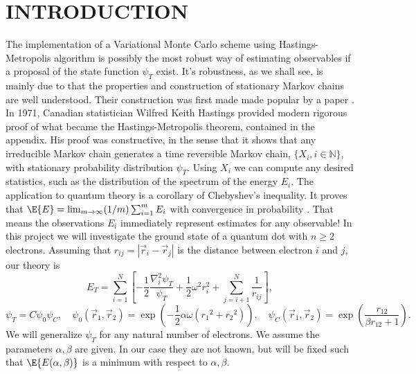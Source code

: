 \documentclass[11pt,english,a4paper]{article}
\begin{document}
\section*{\uppercase{Introduction}}
The implementation of a Variational Monte Carlo scheme using Hastings-Metropolis algorithm is possibly the most robust way of estimating observables if a proposal of the state function $\psi_T$ exist. It's robustness, as we shall see, is mainly due to that the properties and construction of stationary Markov chains are well understood. Their construction was first made made popular by a paper \cite{nicholas_metropolis_equation_1953}. In 1971, Canadian statistician Wilfred Keith Hastings provided modern rigorous proof of what became the Hastings-Metropolis theorem, contained in the appendix. His proof was constructive, in the sense that it shows that any irreducible Markov chain generates a time reversible Markov chain, $\{X_i, i \in \mathbb{N}\}$, with stationary probability distribution $\psi_T$. Using $X_i$ we can compute any desired statistics, such as the distribution of the spectrum of the energy $E_i$. The application to quantum theory is a corollary of Chebyshev's inequality. It proves that $\E{E} = \lim_{m \to \infty} (1/m) \sum_{i=1}^m E_i$ with convergence in probability \parencite{varadhan_probability_2001}. That means the observations $E_i$ immediately represent estimates for any observable! In this project we will investigate the ground state of a quantum dot with $n\geq 2$ electrons. Assuming that $r_{ij} = |\vec{r}_i - \vec r_j|$ is the distance between electron $i$ and $j$, our theory is 
\begin{equation}
E_T = \sum_{i=1}^N \left[ -\frac{1}{2} \frac{\nabla^2_i \psi_T}{\psi_T} + \frac{1}{2} \omega^2 r_i^2 + \sum_{j=i+1}^N \frac{1}{r_{ij}} \right], \label{eq:ET}
\end{equation}
\begin{equation}
\psi_T = C\psi_0 \psi_C, \quad  \psi_0(\vec{r}_1, \vec{r}_2) = \exp \left(-\frac{1}{2} \alpha  \omega  \left( {{r}_1}^2+  {{r}_2}^2\right)\right),  \quad  \psi_C(\vec{r}_1, \vec{r}_2) =  \exp \left( \frac{r_{  12}}{\beta  r_{  12}+1} \right). \label{eq:psiT}
\end{equation}
We will generalize $\psi_T$ for any natural number of electrons. We assume the parameters $\alpha,\beta$ are given. In our case they are not known, but will be fixed such that $\E{E(\alpha,\beta)}$ is a minimum with respect to $\alpha,\beta$.\\
\\
\end{document}
